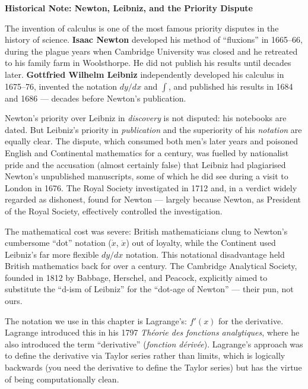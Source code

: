 \documentclass[12pt, openany]{book}
\theoremstyle{plain}
\theoremstyle{definition}
\theoremstyle{remark}
\begin{document}
\begin{remarkbox}
\textbf{Historical Note: Newton, Leibniz, and the Priority Dispute}

The invention of calculus is one of the most famous priority disputes in the history of science. \textbf{Isaac Newton} developed his method of ``fluxions'' in 1665--66, during the plague years when Cambridge University was closed and he retreated to his family farm in Woolsthorpe. He did not publish his results until decades later. \textbf{Gottfried Wilhelm Leibniz} independently developed his calculus in 1675--76, invented the notation $dy/dx$ and $\int$, and published his results in 1684 and 1686 --- decades before Newton's publication.

Newton's priority over Leibniz in \emph{discovery} is not disputed: his notebooks are dated. But Leibniz's priority in \emph{publication} and the superiority of his \emph{notation} are equally clear. The dispute, which consumed both men's later years and poisoned English and Continental mathematics for a century, was fuelled by nationalist pride and the accusation (almost certainly false) that Leibniz had plagiarised Newton's unpublished manuscripts, some of which he did see during a visit to London in 1676. The Royal Society investigated in 1712 and, in a verdict widely regarded as dishonest, found for Newton --- largely because Newton, as President of the Royal Society, effectively controlled the investigation.

The mathematical cost was severe: British mathematicians clung to Newton's cumbersome ``dot'' notation ($\dot{x}$, $\ddot{x}$) out of loyalty, while the Continent used Leibniz's far more flexible $dy/dx$ notation. This notational disadvantage held British mathematics back for over a century. The Cambridge Analytical Society, founded in 1812 by Babbage, Herschel, and Peacock, explicitly aimed to substitute the ``d-ism of Leibniz'' for the ``dot-age of Newton'' --- their pun, not ours.

The notation we use in this chapter is Lagrange's: $f'(x)$ for the derivative. Lagrange introduced this in his 1797 \emph{Th\'{e}orie des fonctions analytiques}, where he also introduced the term ``derivative'' (\emph{fonction d\'{e}riv\'{e}e}). Lagrange's approach was to define the derivative via Taylor series rather than limits, which is logically backwards (you need the derivative to define the Taylor series) but has the virtue of being computationally clean.
\end{remarkbox}
\color{black}
\end{document}
